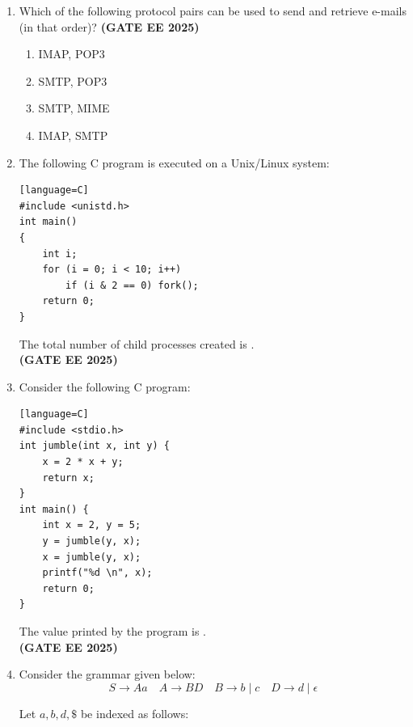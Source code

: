 \documentclass[journal,12pt,onecolumn]{IEEEtran}
\theoremstyle{remark}
\begin{document}
\begin{enumerate}
\item  Which of the following protocol pairs can be used to send and retrieve e-mails (in that order)?  \hfill \textbf{(GATE EE 2025)}
\begin{enumerate}
    \item  IMAP, POP3
    \item  SMTP, POP3
    \item  SMTP, MIME
    \item  IMAP, SMTP
\end{enumerate}

\item  The following C program is executed on a Unix/Linux system:
\begin{verbatim}[language=C]
#include <unistd.h>
int main()
{
    int i;
    for (i = 0; i < 10; i++)
        if (i & 2 == 0) fork();
    return 0;
}
\end{verbatim}

The total number of child processes created is \underline{\hspace{3cm}}. \\[1em]
\hfill \textbf{(GATE EE 2025)}

\item  Consider the following C program:
\begin{verbatim}[language=C]
#include <stdio.h>
int jumble(int x, int y) {
    x = 2 * x + y;
    return x;
}
int main() {
    int x = 2, y = 5;
    y = jumble(y, x);
    x = jumble(y, x);
    printf("%d \n", x);
    return 0;
}
\end{verbatim}

The value printed by the program is \underline{\hspace{3cm}}. \\[1em]
\hfill \textbf{(GATE EE 2025)}

\item  Consider the grammar given below:
\[
S \to Aa \quad 
A \to BD \quad 
B \to b \mid c \quad 
D \to d \mid \epsilon
\]

Let $a, b, d, \$$ be indexed as follows:
\begin{center}
    


\begin{tabular}{|c|c|c|c|}
 

\end{tabular}
\end{center}
\end{enumerate}
\end{document}

